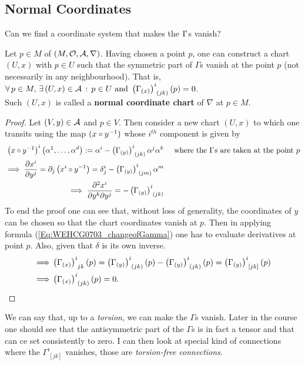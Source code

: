 \subsection{Normal Coordinates}
Can we find a coordinate system that makes the $\ccf{}{}$s vanish?

\begin{theorem}
Let $p \in M$ of $(M, \mathcal{O}, \mathcal{A}, \nabla)$. Having chosen a point $p$, one can construct a chart $(U,x)$ with $p \in U$ such that the symmetric part of $\Gamma$s vanish at the point $p$ (not necessarily in any neighbourhood). That is, \\
$\displaystyle\forall \, p \in M, \, \exists \, (U,x) \in \A \, : \, p \in U \text{ and } \ccfx{i}{(jk)}{(x)}(p) = 0$. \\
Such $(U,x)$ is called a \textbf{normal coordinate chart} of $\nabla$ at $p \in M$.
\end{theorem}

\begin{proof}
Let $(V,y) \in \mathcal{A}$ and $p \in V$. Then consider a new chart $(U,x)$ to which one transits using the map $(x \circ y^{-1})$ whose $i^{th}$ component is given by\\
\begin{align*}
\left(x \after y^{-1}\right)^i\left(\alpha^1,\dotsc,\alpha^d\right) := \alpha^i - \ccfx{i}{(jk)}{(y)} \alpha^j \alpha^k && \text{ where the } \ccf{}{} \text{s are taken at the point } p \\ 
\implies \displaystyle\cibasis[x^i]{y^j} = \partial_j\left(x^i \after y^{-1}\right) = \delta^i_j - \ccfx{i}{(jm)}{(y)} \alpha^m \\
\implies \displaystyle\frac{\partial^2 x^i}{\partial y^k \partial y^j} = - \ccfx{i}{(jk)}{(y)} \\
\end{align*}
To end the proof one can see that, without loss of generality, the coordinates of $y$ can be chosen so that the chart coordinates vanish at $p$. Then in applying formula (\ref{Eq:WEHCG0703_changeofGamma}) one has to evaluate derivatives at point $p$. Also, given that $\delta$ is its own inverse.
\begin{align*}
\implies & \ccfx{i}{jk}{(x)}(p) = \ccfx{i}{(jk)}{(y)}(p) - \ccfx{i}{(jk)}{(y)}(p) = \ccfx{i}{[jk]}{(y)}(p) \\
\implies & \ccfx{i}{(jk)}{(x)}(p) = 0.
\end{align*}
\end{proof}

We can say that, up to a \textit{torsion}, we can make the $\Gamma$s vanish.
Later in the course one should see that the antisymmetric part of the $\Gamma$s is in fact a tensor and that can ce set consistently to zero. I can then look at special kind of connections where the $\Gamma^{i}_{~[jk]}$ vanishes, those are \textit{torsion-free connections}.
